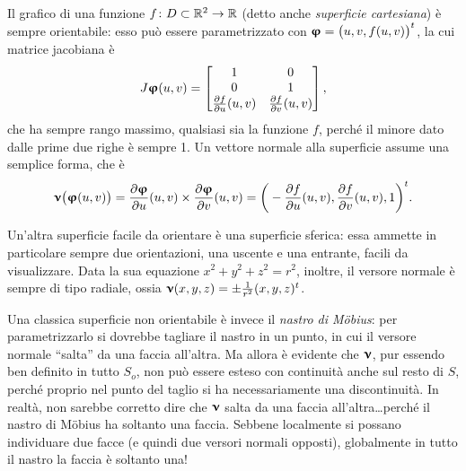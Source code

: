 \begin{osservazione} \label{o:superfici-cartesiane}
	Il grafico di una funzione $f\colon D\subset\mathbb{R}^2\to\mathbb{R}$ (detto anche \emph{superficie cartesiana}) è sempre orientabile: esso può essere parametrizzato con $\bm{\upvarphi}=\big(u,v,f(u,v)\big)^t$, la cui matrice jacobiana è
	\begin{equation*}
		J\bm{\upvarphi}(u,v)=
		\begin{bmatrix}
			1&0\\
			0&1\\
			\frac{\partial {f}}{\partial {u}}(u,v)&\frac{\partial {f}}{\partial {v}}(u,v)
		\end{bmatrix},
	\end{equation*}
	che ha sempre rango massimo, qualsiasi sia la funzione $f$, perch\'e il minore dato dalle prime due righe è sempre 1.
	Un vettore normale alla superficie assume una semplice forma, che è
	\begin{equation*}
		\bm{\upnu}\big(\bm{\upvarphi}(u,v)\big)=\frac{\partial {\bm{\upvarphi}}}{\partial {u}}(u,v)\times\frac{\partial {\bm{\upvarphi}}}{\partial {v}}(u,v)=\bigg(-\frac{\partial {f}}{\partial {u}}(u,v),\frac{\partial {f}}{\partial {v}}(u,v),1\bigg)^t.
	\end{equation*}
\end{osservazione}
Un'altra superficie facile da orientare è una superficie sferica: essa ammette in particolare sempre due orientazioni, una uscente e una entrante, facili da visualizzare.
Data la sua equazione $x^2+y^2+z^2=r^2$, inoltre, il versore normale è sempre di tipo radiale, ossia $\bm{\upnu}(x,y,z)=\pm\frac1{r^2}(x,y,z)^t$.

Una classica superficie non orientabile è invece il \emph{nastro di M\"obius}: per parametrizzarlo si dovrebbe tagliare il nastro in un punto, in cui il versore normale ``salta'' da una faccia all'altra.
Ma allora è evidente che $\bm{\upnu}$, pur essendo ben definito in tutto $S_o$, non può essere esteso con continuità anche sul resto di $S$, perch\'e proprio nel punto del taglio si ha necessariamente una discontinuità.
In realtà, non sarebbe corretto dire che $\bm{\upnu}$ salta da una faccia all'altra\dots perch\'e il nastro di M\"obius ha soltanto una faccia.
Sebbene localmente si possano individuare due facce (e quindi due versori normali opposti), globalmente in tutto il nastro la faccia è soltanto una!

